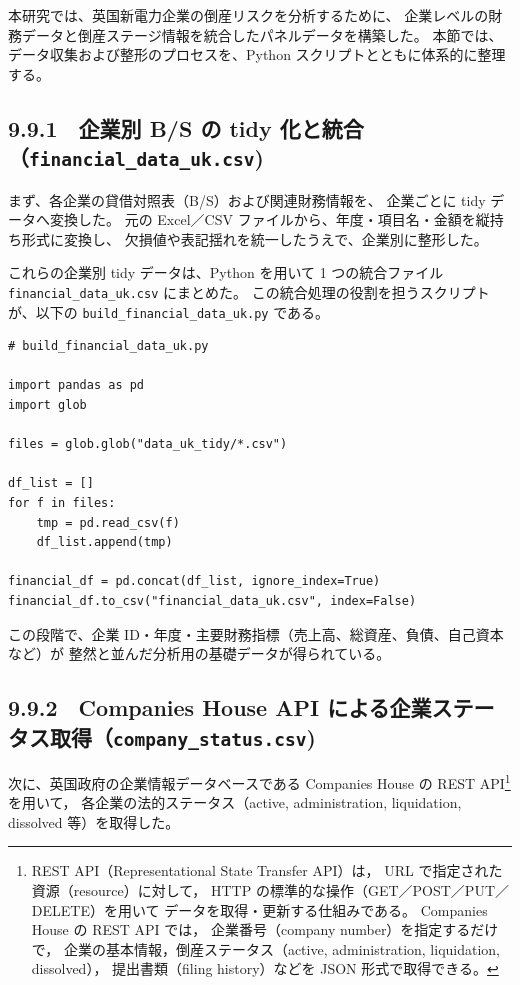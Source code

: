 本研究では、英国新電力企業の倒産リスクを分析するために、
企業レベルの財務データと倒産ステージ情報を統合したパネルデータを構築した。
本節では、データ収集および整形のプロセスを、Python スクリプトとともに体系的に整理する。


\subsection*{9.9.1　企業別 B/S の tidy 化と統合（\texttt{financial\_data\_uk.csv})}

まず、各企業の貸借対照表（B/S）および関連財務情報を、
企業ごとに tidy データへ変換した。
元の Excel／CSV ファイルから、年度・項目名・金額を縦持ち形式に変換し、
欠損値や表記揺れを統一したうえで、企業別に整形した。

これらの企業別 tidy データは、Python を用いて 1 つの統合ファイル
\texttt{financial\_data\_uk.csv} にまとめた。
この統合処理の役割を担うスクリプトが、以下の
\texttt{build\_financial\_data\_uk.py} である。

\begin{verbatim}
# build_financial_data_uk.py

import pandas as pd
import glob

files = glob.glob("data_uk_tidy/*.csv")

df_list = []
for f in files:
    tmp = pd.read_csv(f)
    df_list.append(tmp)

financial_df = pd.concat(df_list, ignore_index=True)
financial_df.to_csv("financial_data_uk.csv", index=False)
\end{verbatim}

この段階で、企業 ID・年度・主要財務指標（売上高、総資産、負債、自己資本など）が
整然と並んだ分析用の基礎データが得られている。


\subsection*{9.9.2　Companies House API による企業ステータス取得（\texttt{company\_status.csv})}

次に、英国政府の企業情報データベースである Companies House の REST API\footnote{
REST API（Representational State Transfer API）は，
URL で指定された資源（resource）に対して，
HTTP の標準的な操作（GET／POST／PUT／DELETE）を用いて
データを取得・更新する仕組みである。
Companies House の REST API では，
企業番号（company number）を指定するだけで，
企業の基本情報，倒産ステータス（active, administration, liquidation, dissolved），
提出書類（filing history）などを JSON 形式で取得できる。
} を用いて，
各企業の法的ステータス（active, administration, liquidation, dissolved 等）を取得した。

